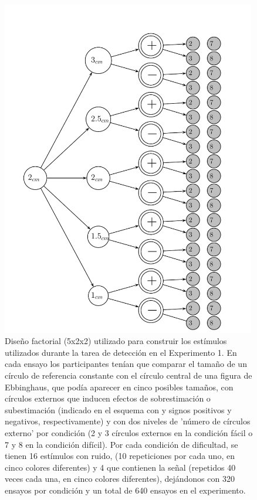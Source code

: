 \begin{itemize}
\begin{figure}[th]
\centering
\includegraphics[width=0.99\textwidth]{Figures/Estimulos_Experimento1} 
\decoRule
\caption[Diseño de Estimulos en el Experimento 1]{Diseño factorial (5x2x2) utilizado para construir los estímulos utilizados durante la tarea de detección en el Experimento 1. En cada ensayo los participantes tenían que comparar el tamaño de un círculo de referencia constante con el círculo central de una figura de Ebbinghaus, que podía aparecer en cinco posibles tamaños, con círculos externos que inducen efectos de sobrestimación o subestimación (indicado en el esquema con  y signos positivos y negativos, respectivamente) y con dos niveles de 'número de círculos externo' por condición (2 y 3 círculos externos en la condición fácil o 7 y 8 en la condición difícil). Por cada condición de dificultad, se tienen 16 estímulos con ruido, (10 repeticiones por cada uno, en cinco colores diferentes) y 4 que contienen la señal (repetidos 40 veces cada una, en cinco colores diferentes), dejándonos con 320 ensayos por condición y un total de 640 ensayos en el experimento.}
\label{fig:Exp_1}
\end{figure}


\end{itemize}

